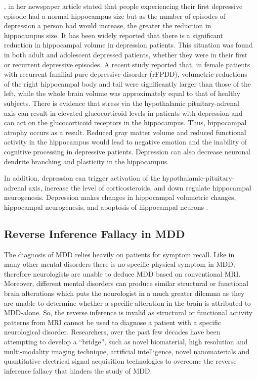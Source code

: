 \documentclass[12pt]{article}
\begin{document}
\textcite{brainshrink}, in her newspaper article stated that people
experiencing their first depressive episode had a normal hippocampus
size but as the number of episodes of depression a person had would
increase, the greater the reduction in hippocampus size. It has been
widely reported that there is a significant reduction in hippocampal
volume in depression patients. This situation was found in both adult
and adolescent depressed patients, whether they were in their first or
recurrent depressive episodes. A recent study reported that, in female
patients with recurrent familial pure depressive disorder (rFPDD),
volumetric reductions of the right hippocampal body and tail were
significantly larger than those of the left, while the whole brain
volume was approximately equal to that of healthy subjects. There is
evidence that stress via the hypothalamic pituitary-adrenal axis can
result in elevated glucocorticoid levels in patients with depression
and can act on the glucocorticoid receptors in the hippocampus. Thus,
hippocampal atrophy occurs as a result. Reduced gray matter volume and
reduced functional activity in the hippocampus would lead to negative
emotion and the inability of cognitive processing in depressive
patients. Depression can also decrease neuronal dendrite branching and
plasticity in the hippocampus.

In addition, depression can trigger activation of the
hypothalamic-pituitary-adrenal axis, increase the level of
corticosteroids, and down regulate hippocampal
neurogenesis. Depression makes changes in hippocampal volumetric
changes, hippocampal neurogenesis, and apoptosis of hippocampal
neurons \cite{effectMDD3}.

\subsection{Reverse Inference Fallacy in MDD}

\vspace{-5pt}
The diagnosis of MDD relies heavily on patients for symptom
recall. Like in many other mental disorders there is no specific
physical symptom in MDD, therefore neurologists are unable to deduce
MDD based on conventional MRI. Moreover, different mental disorders
can produce similar structural or functional brain alterations which
puts the neurologist in a much greater dilemma as they are unable to
determine whether a specific alteration in the brain is attributed to
MDD-alone. So, the reverse inference is invalid as structural or
functional activity patterns from MRI cannot be used to diagnose
a patient with a specific neurological disorder. Researchers, over the
past few decades have been attempting to develop a ``bridge'', such as
novel biomaterial, high resolution and multi-modality imaging
technique, artificial intelligence, novel nanomaterials and
quantitative electrical signal acquisition technologies to overcome
the reverse inference fallacy that hinders the study of
MDD. \cite{zhuo2019rise}
\end{document}
